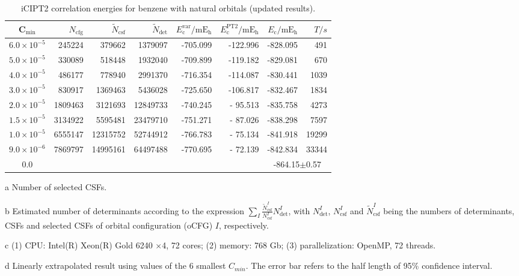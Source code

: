 \documentclass[journal=jcp,manuscript=suppinfo]{achemso}
\begin{document}
\begin{table}[!htp]
	\small
	\caption{iCIPT2 correlation energies for benzene with natural orbitals (updated results).}
\begin{threeparttable}
	\centering
	\begin{tabular}{c|rrrrrrr}\toprule
		C$_{\text{min}}$&$N_{\mathrm{cfg}}$&$\tilde{N}_{\mathrm{csf}}$\tnote{a}&$\tilde{N}_{\mathrm{det}}$\tnote{b}
		&$E_{\mathrm{c}}^{\mathrm{var}}/\mathrm{mE_h}$&$E_{\mathrm{c}}^{\mathrm{PT2}}/\mathrm{mE_h}$&$E_{\mathrm{c}}/\mathrm{mE_h}$&$T/s$\tnote{c}\\\toprule
		$6.0\times10^{-5}$ &   245224 &   379662 & 1379097
		&  -705.099  &  -122.996&  -828.095 &491\\
		$5.0\times10^{-5}$ &   330089 &   518448 & 1932040
		&  -709.899  &  -119.182&  -829.081 &670\\
		$4.0\times10^{-5}$ &   486177 &   778940 & 2991370
		&  -716.354  &  -114.087&  -830.441 &1039\\
		$3.0\times10^{-5}$ &   830917 &  1369463 & 5436028
		&  -725.650  &  -106.817&  -832.467 &1834\\
		$2.0\times10^{-5}$ &  1809463 &  3121693 &12849733
		&  -740.245  &  - 95.513&  -835.758 &4273\\
		$1.5\times10^{-5}$ &  3134922 &  5595481 &23479710
		&  -751.271  &  - 87.026&  -838.298 &7597\\
		$1.0\times10^{-5}$ &  6555147 & 12315752 &52744912
		&  -766.783  &  - 75.134&  -841.918 &19299\\
		$9.0\times10^{-6}$ &  7869797 & 14995161 &64497488
		&  -770.695  &  - 72.139&  -842.834 &33344\\\midrule
		0.0\tnote{d}&&&&&&\multicolumn{2}{c}{-864.15$\pm$0.57}\\\bottomrule
	\end{tabular}
\begin{tablenotes}
	\item[a]Number of selected CSFs.
	\item[b]Estimated number of determinants according to the expression $\sum_I\frac{\tilde{N}_{\mathrm{csf}}^I}{N_{\mathrm{csf}}^I}N_{\mathrm{det}}^I$, with $N_{\mathrm{det}}^I$, $N_{\mathrm{csf}}^I$ and $\tilde{N}_{\mathrm{csf}}^I$ being the numbers of determinants, CSFs and selected CSFs of orbital configuration (oCFG) $I$, respectively.
	\item[c](1) CPU: Intel(R) Xeon(R) Gold 6240 $\times$4, 72 cores; (2) memory: 768 Gb; (3) parallelization: OpenMP, 72 threads.
	\item[d]Linearly extrapolated result using values of the 6 smallest $C_{min}$. The error bar refers to the half length of 95\% confidence interval.
\end{tablenotes}
\end{threeparttable}
\label{NewNO}
\end{table}
\end{document}
